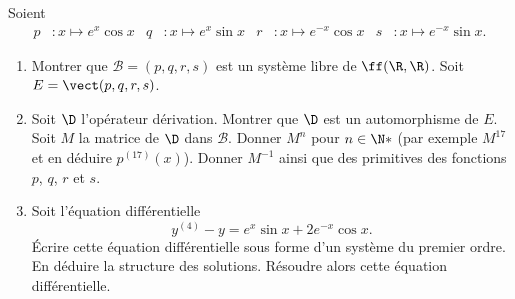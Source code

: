 \begin{enonce}
\begin{exercise}[ID={RMS 121-2 E820 Centrale PC},subtitle={},tags={}]
Soient
\begin{align*}
p&:x\mapsto e^x\cos x &
q&:x\mapsto e^x\sin x &
r&:x\mapsto e^{-x}\cos x &
s&:x\mapsto e^{-x}\sin x.
\end{align*}
\begin{enumerate}
  \item Montrer que $\mathcal B=(p,q,r,s)$ est un système libre de $\ff(\R,\R)$. Soit $E=\vect(p,q,r,s)$.
  \item Soit $\D$ l'opérateur dérivation.
    Montrer que $\D$ est un automorphisme de $E$.
    Soit $M$ la matrice de $\D$ dans $\mathcal B$.
	Donner $M^n$ pour $n\in\N*$ (par exemple $M^{17}$ et en déduire $p^{(17)}(x)$).
    Donner $M^{-1}$ ainsi que des primitives des fonctions $p$, $q$, $r$ et $s$.
  \item Soit l'équation différentielle
    \begin{equation}
      \tag{E}\label{eq:39016255}
      y^{(4)}-y=e^x\sin x+2e^{-x}\cos x.
    \end{equation}
    Écrire cette équation différentielle sous forme d'un système du premier ordre.
    En déduire la structure des solutions.
    Résoudre alors cette équation différentielle.
\end{enumerate}
\end{exercise}
\begin{solution}
\end{solution}
\end{enonce}
